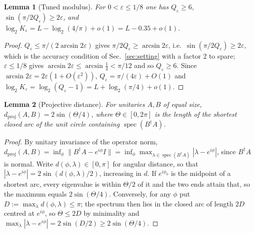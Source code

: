 \documentclass[aps,prx,twocolumn,superscriptaddress,nofootinbib,longbibliography]{revtex4-2}
\theoremstyle{plain}
\newtheorem{lemma}{Lemma}
\theoremstyle{definition}
\theoremstyle{remark}
\newcommand{\dproj}{d_{\mathrm{proj}}}
\DeclareMathOperator{\spec}{spec}
\begin{document}
\begin{lemma}[Tuned modulus]\label{lem:tuned}
For $0<\varepsilon\le1/8$ one has $Q_\varepsilon\ge6$, $\sin(\pi/2Q_\varepsilon)\ge2\varepsilon$, and $\log_2K_\varepsilon=L-\log_2(4/\pi)+o(1)=L-0.35+o(1)$.
\end{lemma}
\begin{proof}
$Q_\varepsilon\le\pi/(2\arcsin2\varepsilon)$ gives $\pi/2Q_\varepsilon\ge\arcsin2\varepsilon$, i.e.\ $\sin(\pi/2Q_\varepsilon)\ge2\varepsilon$, which is the accuracy condition of Sec.~\ref{sec:setting} with a factor $2$ to spare; $\varepsilon\le1/8$ gives $\arcsin2\varepsilon\le\arcsin\tfrac14<\pi/12$ and so $Q_\varepsilon\ge6$. Since $\arcsin2\varepsilon=2\varepsilon(1+O(\varepsilon^2))$, $Q_\varepsilon=\pi/(4\varepsilon)+O(1)$ and $\log_2K_\varepsilon=\log_2(Q_\varepsilon-1)=L+\log_2(\pi/4)+o(1)$.
\end{proof}

\begin{lemma}[Projective distance]\label{lem:dproj}
For unitaries $A,B$ of equal size, $\dproj(A,B)=2\sin(\Theta/4)$, where $\Theta\in[0,2\pi]$ is the length of the shortest closed arc of the unit circle containing $\spec(B^\dagger A)$.
\end{lemma}
\begin{proof}
By unitary invariance of the operator norm, $\dproj(A,B)=\inf_\phi\|B^\dagger A-e^{i\phi}I\|=\inf_\phi\max_{\lambda\in\spec(B^\dagger A)}|\lambda-e^{i\phi}|$, since $B^\dagger A$ is normal. Write $d(\phi,\lambda)\in[0,\pi]$ for angular distance, so that $|\lambda-e^{i\phi}|=2\sin(d(\phi,\lambda)/2)$, increasing in $d$. If $e^{i\phi_0}$ is the midpoint of a shortest arc, every eigenvalue is within $\Theta/2$ of it and the two ends attain that, so the maximum equals $2\sin(\Theta/4)$. Conversely, for any $\phi$ put $D:=\max_\lambda d(\phi,\lambda)\le\pi$; the spectrum then lies in the closed arc of length $2D$ centred at $e^{i\phi}$, so $\Theta\le2D$ by minimality and $\max_\lambda|\lambda-e^{i\phi}|=2\sin(D/2)\ge2\sin(\Theta/4)$.
\end{proof}
\end{document}
